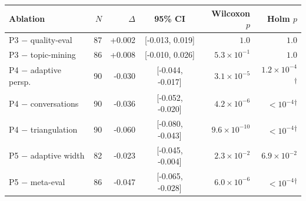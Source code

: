 \begin{tabular}{lrrcrr}
\toprule
Ablation & $N$ & $\Delta$ & 95\% CI & Wilcoxon $p$ & Holm $p$\\
\midrule
P3 $-$ quality-eval & 87 & +0.002 & [-0.013, 0.019] & $1.0$ & $1.0$ \\
P3 $-$ topic-mining & 86 & +0.008 & [-0.010, 0.026] & $5.3\times10^{-1}$ & $1.0$ \\
P4 $-$ adaptive persp. & 90 & -0.030 & [-0.044, -0.017] & $3.1\times10^{-5}$ & $1.2\times10^{-4}$\textsuperscript{$\dagger$} \\
P4 $-$ conversations & 90 & -0.036 & [-0.052, -0.020] & $4.2\times10^{-6}$ & $<10^{-4}$\textsuperscript{$\dagger$} \\
P4 $-$ triangulation & 90 & -0.060 & [-0.080, -0.043] & $9.6\times10^{-10}$ & $<10^{-4}$\textsuperscript{$\dagger$} \\
P5 $-$ adaptive width & 82 & -0.023 & [-0.045, -0.004] & $2.3\times10^{-2}$ & $6.9\times10^{-2}$ \\
P5 $-$ meta-eval & 86 & -0.047 & [-0.065, -0.028] & $6.0\times10^{-6}$ & $<10^{-4}$\textsuperscript{$\dagger$} \\
\bottomrule
\end{tabular}